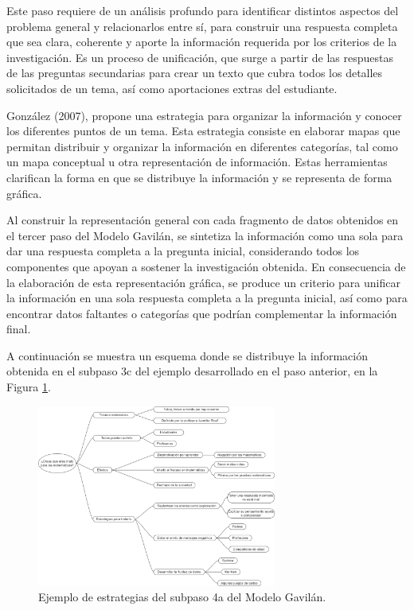 Este paso requiere de un análisis profundo para identificar distintos aspectos del problema general y relacionarlos entre sí, para construir una respuesta completa que sea clara, coherente y aporte la información requerida por los criterios de la investigación. Es un proceso de unificación, que surge a partir de las respuestas de las preguntas secundarias para crear un texto que cubra todos los detalles solicitados de un tema, así como aportaciones extras del estudiante.

González (2007), propone una estrategia para organizar la información y conocer los diferentes puntos de un tema. Esta estrategia consiste en elaborar mapas que permitan distribuir y organizar la información en diferentes categorías, tal como un mapa conceptual u otra representación de información. Estas herramientas clarifican la forma en que se distribuye la información y se representa de forma gráfica.

Al construir la representación general con cada fragmento de datos obtenidos en el tercer paso del Modelo Gavilán, se sintetiza la información como una sola para dar una respuesta completa a la pregunta inicial, considerando todos los componentes que apoyan a sostener la investigación obtenida. En consecuencia de la elaboración de esta representación gráfica, se produce un criterio para unificar la información en una sola respuesta completa a la pregunta inicial, así como para encontrar datos faltantes o categorías que podrían complementar la información final.

A continuación se muestra un esquema donde se distribuye la información obtenida en el subpaso 3c del ejemplo  desarrollado en el paso anterior, en la Figura \ref{fig:27}.

\begin{figure}[H]
  \centering
  \includegraphics[width=0.70\textwidth]{Cap2/Figuras/Ejemplo de estraregia del subpaso 4a.jpg}
  \caption{Ejemplo de estrategias del subpaso 4a del Modelo Gavilán.}
  \label{fig:27}
\end{figure}

